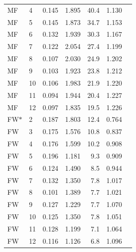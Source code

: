 \begin{longtable}{llrrrrr}
MF & 4 & 0.145 & 1.895 & 40.4 & 1.130 \\
MF & 5 & 0.145 & 1.873 & 34.7 & 1.153 \\
MF & 6 & 0.132 & 1.939 & 30.3 & 1.167 \\
MF & 7 & 0.122 & 2.054 & 27.4 & 1.199 \\
MF & 8 & 0.107 & 2.030 & 24.9 & 1.202 \\
MF & 9 & 0.103 & 1.923 & 23.8 & 1.212 \\
MF & 10 & 0.106 & 1.983 & 21.9 & 1.220 \\
MF & 11 & 0.094 & 1.944 & 20.4 & 1.227 \\
MF & 12 & 0.097 & 1.835 & 19.5 & 1.226 \\
FW$\ast$ & 2 & 0.187 & 1.803 & 12.4 & 0.764 \\
FW & 3 & 0.175 & 1.576 & 10.8 & 0.837 \\
FW & 4 & 0.176 & 1.599 & 10.2 & 0.908 \\
FW & 5 & 0.196 & 1.181 & 9.3 & 0.909 \\
FW & 6 & 0.124 & 1.490 & 8.5 & 0.944 \\
FW & 7 & 0.132 & 1.350 & 7.8 & 1.017 \\
FW & 8 & 0.101 & 1.389 & 7.7 & 1.021 \\
FW & 9 & 0.127 & 1.229 & 7.7 & 1.070 \\
FW & 10 & 0.125 & 1.350 & 7.8 & 1.051 \\
FW & 11 & 0.128 & 1.199 & 7.1 & 1.064 \\
FW & 12 & 0.116 & 1.126 & 6.8 & 1.096 \\
\bottomrule
\end{longtable}
